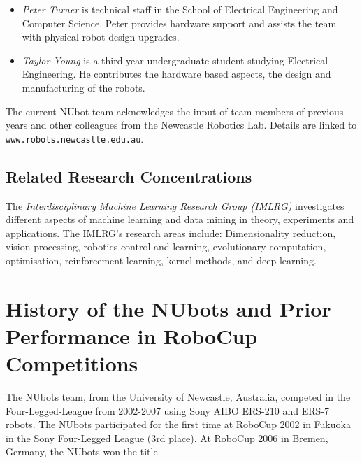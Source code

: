 \documentclass{llncs}
\begin{document}
\begin{itemize}
\item \emph{Peter Turner} is technical staff in the School of Electrical Engineering and Computer Science. Peter provides hardware support and assists the team with physical robot design upgrades. %

\item \emph{Taylor Young} is a third year undergraduate student studying Electrical Engineering. He contributes the hardware based aspects, the design and manufacturing of the robots.

\end{itemize}
The current NUbot team acknowledges the input of team members of previous years and other colleagues from the Newcastle Robotics Lab. Details are linked to 
\texttt{www.robots.newcastle.edu.au}.

\subsection{Related Research Concentrations}
The \emph{Interdisciplinary Machine Learning Research Group (IMLRG)} investigates different aspects of machine learning and data mining in theory, experiments and applications. The IMLRG's research areas include: Dimensionality reduction, vision processing, robotics control and learning,  evolutionary computation, optimisation, reinforcement learning, kernel methods, and deep learning. %

\section{History of the NUbots and Prior Performance in RoboCup Competitions \cite{AmosEtAl2017}}
The NUbots team, from the University of Newcastle, Australia, competed in the Four-Legged-League from 2002-2007 using Sony AIBO ERS-210 and ERS-7 robots. The NUbots participated for the first time at RoboCup 2002 in Fukuoka in the Sony Four-Legged League (3rd place). At RoboCup 2006 in Bremen, Germany, the NUbots won the title. %
\end{document}
